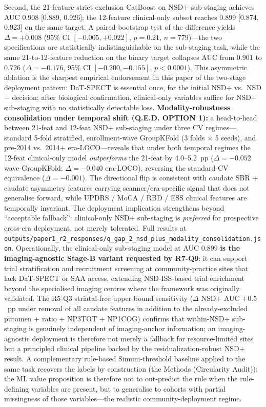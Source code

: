 \documentclass[10pt,letterpaper]{article}
\begin{document}
Second, the 21-feature strict-exclusion CatBoost on NSD$+$ sub-staging achieves AUC $0.908$ [0.889, 0.926]; the 12-feature clinical-only subset reaches $0.899$ [0.874, 0.923] on the same target. A paired-bootstrap test of the difference yields $\Delta{=}+0.008$ (95\% CI $[-0.005, +0.022]$, $p{=}0.21$, $n{=}779$)---the two specifications are statistically indistinguishable on the sub-staging task, while the same 21-to-12-feature reduction on the binary target collapses AUC from $0.901$ to $0.726$ ($\Delta{=}-0.176$, 95\% CI $[-0.200, -0.155]$, $p{<}0.0001$). This asymmetric ablation is the sharpest empirical endorsement in this paper of the two-stage deployment pattern: DaT-SPECT is essential once, for the initial NSD$+$ vs.\ NSD$-$ decision; after biological confirmation, clinical-only variables suffice for NSD$+$ sub-staging with no statistically detectable loss. \textbf{Modality-robustness consolidation under temporal shift (Q.E.D. OPTION 1):} a head-to-head between 21-feat and 12-feat NSD$+$ sub-staging under three CV regimes---standard 5-fold stratified, enrollment-wave GroupKFold (3 folds $\times$ 5 seeds), and pre-2014 vs.\ 2014$+$ era-LOCO---reveals that under both temporal regimes the 12-feat clinical-only model \emph{outperforms} the 21-feat by 4.0--5.2~pp ($\Delta{=}{-}0.052$ wave-GroupKFold; $\Delta{=}{-}0.040$ era-LOCO), reversing the standard-CV equivalence ($\Delta{=}{-}0.001$). The directional flip is consistent with caudate SBR + caudate asymmetry features carrying scanner/era-specific signal that does not generalise forward, while UPDRS / MoCA / RBD / ESS clinical features are temporally invariant. The deployment implication strengthens beyond ``acceptable fallback'': clinical-only NSD$+$ sub-staging is \emph{preferred} for prospective cross-era deployment, not merely tolerated. Full results at \texttt{outputs/paper1\_r2\_responses/q\_gap\_2\_nsd\_plus\_modality\_consolidation.json}. Operationally, the clinical-only sub-staging model at AUC $0.899$ \textbf{is the imaging-agnostic Stage-B variant requested by R7-Q9}: it can support trial stratification and recruitment screening at community-practice sites that lack DaT-SPECT or SAA access, extending NSD-ISS-based trial enrichment beyond the specialised imaging centres where the framework was originally validated. The R5-Q3 striatal-free upper-bound sensitivity ($\Delta$ NSD$+$ AUC $+0.5$~pp under removal of all caudate features in addition to the already-excluded putamen + ratio + NP3TOT + NP1COG) confirms that within-NSD$+$ sub-staging is genuinely independent of imaging-anchor information; an imaging-agnostic deployment is therefore not merely a fallback for resource-limited sites but a principled clinical pipeline backed by the residualization-robust NSD$+$ result. A complementary rule-based Simuni-threshold baseline applied to the same task recovers the labels by construction (the Methods (Circularity Audit)); the ML value proposition is therefore not to out-predict the rule when the rule-defining variables are present, but to generalise to cohorts with partial missingness of those variables---the realistic community-deployment regime.
\end{document}
